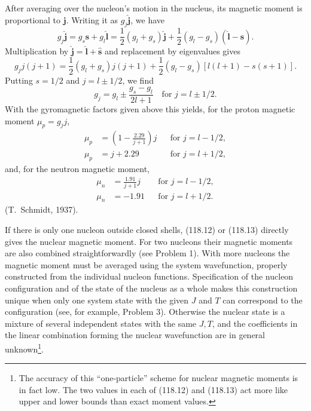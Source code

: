 After averaging over the nucleon's motion in the nucleus, its magnetic moment
is proportional to $\mathbf j$. Writing it as $g_j\hat{\mathbf j}$, we have
\[
 g_j\hat{\mathbf j}=g_s\hat{\mathbf s}+g_l\hat{\mathbf l}
 =\frac12(g_l+g_s)\hat{\mathbf j}
 +\frac12(g_l-g_s)(\hat{\mathbf l}-\hat{\mathbf s}).
\]
Multiplication by $\hat{\mathbf j}=\hat{\mathbf l}+\hat{\mathbf s}$ and
replacement by eigenvalues gives
\[
 g_jj(j+1)=\frac12(g_l+g_s)j(j+1)
 +\frac12(g_l-g_s)[l(l+1)-s(s+1)].
\]
Putting $s=1/2$ and $j=l\pm1/2$, we find
\begin{equation}
 g_j=g_l\pm\frac{g_s-g_l}{2l+1}\quad\text{for }j=l\pm1/2.
 \tag{118.11}
\end{equation}
With the gyromagnetic factors given above this yields, for the proton magnetic
moment $\mu_p=g_jj$,
\begin{equation}
 \begin{aligned}
  \mu_p&=\left(1-\frac{2{.}29}{j+1}\right)j
     &&\text{for }j=l-1/2,\\
  \mu_p&=j+2{.}29 &&\text{for }j=l+1/2,
 \end{aligned}
 \tag{118.12}
\end{equation}
and, for the neutron magnetic moment,
\begin{equation}
 \begin{aligned}
  \mu_n&=\frac{1{.}91}{j+1}j &&\text{for }j=l-1/2,\\
  \mu_n&=-1{.}91 &&\text{for }j=l+1/2.
 \end{aligned}
 \tag{118.13}
\end{equation}
(T.~Schmidt, 1937).

If there is only one nucleon outside closed shells, (118.12) or (118.13)
directly gives the nuclear magnetic moment. For two nucleons their magnetic
moments are also combined straightforwardly (see Problem 1). With more
nucleons the magnetic moment must be averaged using the system wavefunction,
properly constructed from the individual nucleon functions. Specification of
the nucleon configuration and of the state of the nucleus as a whole makes
this construction unique when only one system state with the given $J$ and
$T$ can correspond to the configuration (see, for example, Problem 3).
Otherwise the nuclear state is a mixture of several independent states with
the same $J,T$, and the coefficients in the linear combination forming the
nuclear wavefunction are in general unknown\footnote{The accuracy of this
``one-particle'' scheme for nuclear magnetic moments is in fact low. The two
values in each of (118.12) and (118.13) act more like upper and lower bounds
than exact moment values.}.


